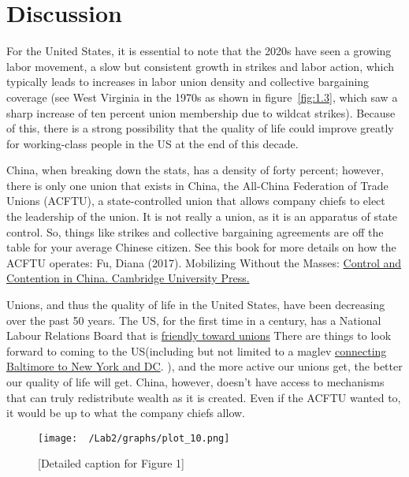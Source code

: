 \documentclass[11pt]{article}\usepackage[]{graphicx}\usepackage[]{xcolor}
\begin{document}
\clearpage
\section{Discussion}
For the United States, it is essential to note that the 2020s have seen a growing labor movement, a slow but consistent growth in strikes and labor action, which typically leads to increases in labor union density and collective bargaining coverage (see West Virginia in the 1970s as shown in figure~\ref{fig:1.3}, which saw a sharp increase of ten percent union membership due to wildcat strikes). Because of this, there is a strong possibility that the quality of life could improve greatly for working-class people in the US at the end of this decade. 

China, when breaking down the stats, has a density of forty percent; however, there is only one union that exists in China, the All-China Federation of Trade Unions (ACFTU), a state-controlled union that allows company chiefs to elect the leadership of the union. It is not really a union, as it is an apparatus of state control. So, things like strikes and collective bargaining agreements are off the table for your average Chinese citizen. See this book for more details on how the ACFTU operates:  Fu, Diana (2017). Mobilizing Without the Masses: \href{https://www.amazon.com/Mobilizing-without-Masses-Contention-Contentious/dp/1108430414}{Control and Contention in China. Cambridge University Press.}

Unions, and thus the quality of life in the United States, have been decreasing over the past 50 years. The US, for the first time in a century, has a National Labour Relations Board that is \href {https://www.theguardian.com/us-news/2023/sep/02/union-nlrb-decision-delays-busting}{friendly toward unions} There are things to look forward to coming to the US(including but not limited to a maglev \href{https://northeastmaglev.com/project/}{connecting Baltimore to New York and DC}. ), and the more active our unions get, the better our quality of life will get. China, however, doesn't have access to mechanisms that can truly redistribute wealth as it is created. Even if the ACFTU wanted to, it would be up to what the company chiefs allow. 




\begin{figure}[h]
\centering
  \begin{minipage}{0.9\linewidth}
  \texttt{[image: ~/Lab2/graphs/plot\_10.png]}
  \caption{[Detailed caption for Figure 1]}
  \label{fig:1.1}
  \end{minipage}
\end{figure}
\end{document}
